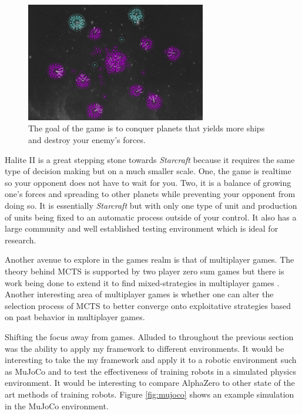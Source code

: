 \documentclass{article}
\begin{document}
  \begin{figure}[H]
    \centering
      \includegraphics[width=0.7\textwidth]{halite}
    \caption[A game of Halite II in progress]{The goal of the game is to conquer planets that yields more ships and destroy your enemy's forces.}
    \label{fig:halite}
  \end{figure}

  Halite II is a great stepping stone towards \textit{Starcraft} because it requires the same type of decision making but on a much smaller scale. One, the game is realtime so your opponent does not have to wait for you. Two, it is a balance of growing one's forces and spreading to other planets while preventing your opponent from doing so. It is essentially \textit{Starcraft} but with only one type of unit and production of units being fixed to an automatic process outside of your control. It also has a large community and well established testing environment which is ideal for research.

  Another avenue to explore in the games realm is that of multiplayer games. The theory behind MCTS is supported by two player zero sum games but there is work being done to extend it to find mixed-strategies in multiplayer games \cite{sturtevant_analysis_2008}. Another interesting area of multiplayer games is whether one can alter the selection process of MCTS to better converge onto exploitative strategies based on past behavior in multiplayer games.

  Shifting the focus away from games. Alluded to throughout the previous section was the ability to apply my framework to different environments. It would be interesting to take the my framework and apply it to a robotic environment such as MuJoCo and to test the effectiveness of training robots in a simulated physics environment. It would be interesting to compare AlphaZero to other state of the art methods of training robots. Figure \ref{fig:mujoco} shows an example simulation in the MuJoCo environment.
\end{document}
